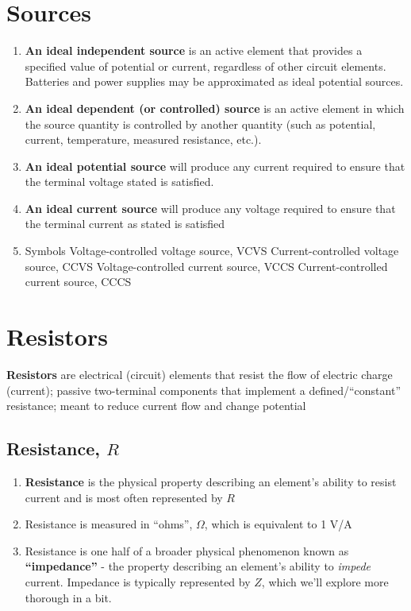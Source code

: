 \documentclass[11pt]{book}
\begin{document}
\section{Sources}
\begin{enumerate}
	\item \textbf{An ideal independent source} is an active element that provides a specified value of potential or current, regardless of other circuit elements.
	\subitem Batteries and power supplies may be approximated as ideal potential sources.
	\item \textbf{An ideal dependent (or controlled) source} is an active element in which the source quantity is controlled by another quantity (such as potential, current, temperature, measured resistance, etc.).
	\item \textbf{An ideal potential source} will produce any current required to ensure that the terminal voltage stated is satisfied.
	\item \textbf{An ideal current source} will produce any voltage required to ensure that the terminal current as stated is satisfied
	\item Symbols
	\subitem Voltage-controlled voltage source, VCVS
	\subitem Current-controlled voltage source, CCVS
	\subitem Voltage-controlled current source, VCCS
	\subitem Current-controlled current source, CCCS 
\end{enumerate}

\section{Resistors}
\textbf{Resistors} are electrical (circuit) elements that resist the flow of electric charge (current); passive two-terminal components that implement a defined/``constant'' resistance; meant to reduce current flow and change potential

\subsection{Resistance, $R$}
\begin{enumerate}
	\item \textbf{Resistance} is the physical property describing an element's ability to resist current and is most often represented by $R$
	\item Resistance is measured in ``ohms'', $\Omega$, which is equivalent to 1 V/A
	\item Resistance is one half of a broader physical phenomenon known as \textbf{``impedance''} - the property describing an element's ability to \textit{impede} current. Impedance is typically represented by $Z$, which we'll explore more thorough in a bit.
\end{enumerate}
\end{document}

